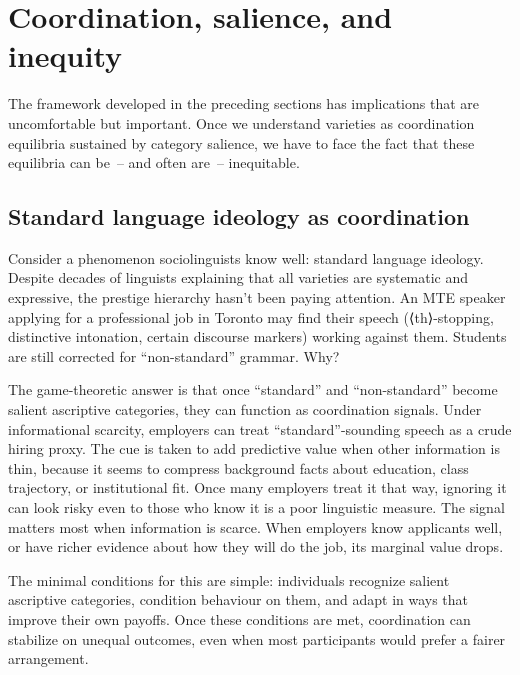 \documentclass[11pt,letterpaper]{article}
\begin{document}
\section{Coordination, salience, and inequity}
\label{sec:inequity}

The framework developed in the preceding sections has implications that are uncomfortable but important. Once we understand varieties as coordination equilibria sustained by category salience, we have to face the fact that these equilibria can be~-- and often are~-- inequitable.

\subsection{Standard language ideology as coordination}

Consider a phenomenon sociolinguists know well: standard language ideology. Despite decades of linguists explaining that all varieties are systematic and expressive, the prestige hierarchy hasn't been paying attention. An MTE speaker applying for a professional job in Toronto may find their speech (⟨th⟩-stopping, distinctive intonation, certain discourse markers) working against them. Students are still corrected for \enquote{non-standard} grammar. Why?

The game-theoretic answer is that once \enquote{standard} and \enquote{non-standard} become salient ascriptive categories, they can function as coordination signals. Under informational scarcity, employers can treat \enquote{standard}-sounding speech as a crude hiring proxy. The cue is taken to add predictive value when other information is thin, because it seems to compress background facts about education, class trajectory, or institutional fit. Once many employers treat it that way, ignoring it can look risky even to those who know it is a poor linguistic measure. The signal matters most when information is scarce. When employers know applicants well, or have richer evidence about how they will do the job, its marginal value drops.

The minimal conditions for this are simple: individuals recognize salient ascriptive categories, condition behaviour on them, and adapt in ways that improve their own payoffs. Once these conditions are met, coordination can stabilize on unequal outcomes, even when most participants would prefer a fairer arrangement.
\end{document}
